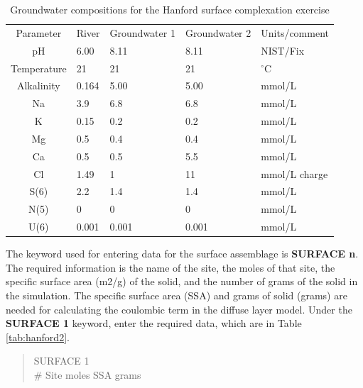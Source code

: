 \begin{table}[h]
\begin{center}
\centering
\caption{Groundwater compositions for the Hanford surface complexation exercise}
\begin{tabular}{cllll}
\toprule
Parameter  	& River	& Groundwater 1	& Groundwater 2	& Units/comment \\
pH	        & 6.00	& 8.11	        & 8.11	        & NIST/Fix \\
Temperature	& 21	  & 21	          & 21	          & $^\circ$C  \\
Alkalinity	& 0.164	& 5.00	        & 5.00	        & mmol/L \\
Na	        & 3.9	  & 6.8	          & 6.8	          & mmol/L \\
K	          & 0.15	& 0.2	          & 0.2	          & mmol/L \\
Mg	        & 0.5	  & 0.4	          & 0.4	          & mmol/L \\
Ca	        & 0.5	  & 0.5	          & 5.5	          & mmol/L \\
Cl	        & 1.49	& 1	            & 11	          & mmol/L charge \\
S(6)	      & 2.2	  & 1.4	          & 1.4	          & mmol/L \\
N(5)	      & 0	    & 0	            & 0	            & mmol/L \\
U(6)	      & 0.001	& 0.001	        & 0.001	        & mmol/L \\
\bottomrule
\end{tabular}
\label{tab:hanford1}
\end{center}
\end{table}

The keyword used for entering data for the surface assemblage is {\color{red}\textbf{SURFACE n}}.  
The required information is the name of the site, the moles of that site, 
the specific surface area (m2/g) of the solid, and the number of 
grams of the solid in the simulation.  
The specific surface area (SSA) and grams of solid (grams) 
are needed for calculating the coulombic term in the diffuse layer model.  
Under the {\color{red}\textbf{SURFACE 1}} keyword, 
enter the required data, which are in Table \ref{tab:hanford2}.

\begin{quote}
{\color{red}SURFACE 1} \\
\# Site	moles	SSA	grams \\
\end{quote}


